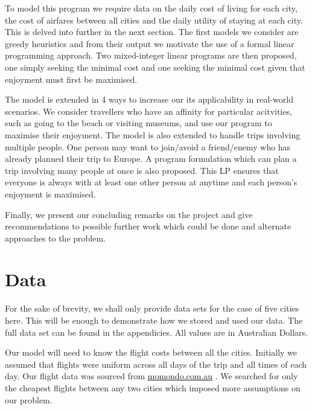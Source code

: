 \documentclass[12pt]{article}
\begin{document}
To model this program we require data on the daily cost of living for each city, the cost of airfares between all cities and the daily utility of staying at each city. This is delved into further in the next section. The first models we consider are greedy heuristics and from their output we motivate the use of a formal linear programming approach. Two mixed-integer linear programs are then proposed, one simply seeking the minimal cost and one seeking the minimal cost given that enjoyment must first be maximised.

The model is extended in 4 ways to increase our its applicability in real-world scenarios. We consider travellers who have an affinity for particular acitvities, such as going to the beach or visiting museums, and use our program to maximise their enjoyment. The model is also extended to handle trips involving multiple people. One person may want to join/avoid a friend/enemy who has already planned their trip to Europe. A program formulation which can plan a trip involving many people at once is also proposed. This LP ensures that everyone is always with at least one other person at anytime and each person's enjoyment is maximised.

Finally, we present our concluding remarks on the project and give recommendations to possible further work which could be done and alternate approaches to the problem.



\pagebreak
\section{Data} 
\label{sec:data}


For the sake of brevity, we shall only provide data sets for the case of five cities here. This will be enough to demonstrate how we stored and used our data. The full data set can be found in the appendicies. All values are in Australian Dollars.

Our model will need to know the flight costs between all the cities. Initially we assumed that flights were uniform across all days of the trip and all times of each day. Our flight data was sourced from \url{momondo.com.au} \cite{momondo}. We searched for only the cheapest flights between any two cities which imposed more assumptions on our problem.
\end{document}
